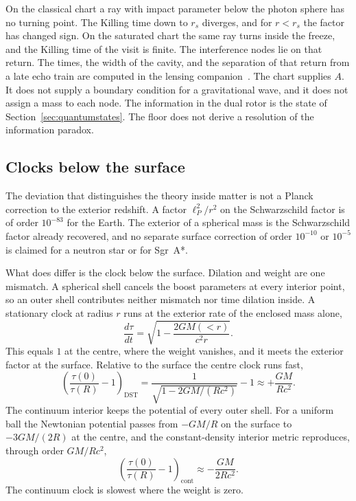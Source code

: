 \documentclass[a4paper]{article}
\begin{document}
On the classical chart a ray with impact parameter below the photon sphere has no turning point. The Killing time down to \(r_s\) diverges, and for \(r<r_s\) the factor has changed sign. On the saturated chart the same ray turns inside the freeze, and the Killing time of the visit is finite. The interference nodes lie on that return. The times, the width of the cavity, and the separation of that return from a late echo train are computed in the lensing companion~\cite{dst-lensing}. The chart supplies \(A\). It does not supply a boundary condition for a gravitational wave, and it does not assign a mass to each node. The information in the dual rotor is the state of Section~\ref{sec:quantumstates}. The floor does not derive a resolution of the information paradox.

\subsection{Clocks below the surface}
\label{subsec:interior-clock}

The deviation that distinguishes the theory inside matter is not a Planck correction to the exterior redshift. A factor \(\ell_P^{2}/r^{2}\) on the Schwarzschild factor is of order \(10^{-83}\) for the Earth. The exterior of a spherical mass is the Schwarzschild factor already recovered, and no separate surface correction of order \(10^{-10}\) or \(10^{-5}\) is claimed for a neutron star or for Sgr~A*.

What does differ is the clock below the surface. Dilation and weight are one mismatch. A spherical shell cancels the boost parameters at every interior point, so an outer shell contributes neither mismatch nor time dilation inside. A stationary clock at radius \(r\) runs at the exterior rate of the enclosed mass alone,
\begin{equation}
\label{eq:interior-clock}
\frac{d\tau}{dt}
=\sqrt{1-\frac{2GM(<r)}{c^{2}r}}.
\end{equation}
This equals \(1\) at the centre, where the weight vanishes, and it meets the exterior factor at the surface. Relative to the surface the centre clock runs fast,
\begin{equation}
\label{eq:dst-centre}
\left(\frac{\tau(0)}{\tau(R)}-1\right)_{\mathrm{DST}}
=\frac{1}{\sqrt{1-2GM/(Rc^{2})}}-1
\approx +\frac{GM}{Rc^{2}}.
\end{equation}
The continuum interior keeps the potential of every outer shell. For a uniform ball the Newtonian potential passes from \(-GM/R\) on the surface to \(-3GM/(2R)\) at the centre, and the constant-density interior metric reproduces, through order \(GM/Rc^{2}\),
\begin{equation}
\label{eq:continuum-centre}
\left(\frac{\tau(0)}{\tau(R)}-1\right)_{\mathrm{cont}}
\approx -\frac{GM}{2Rc^{2}}.
\end{equation}
The continuum clock is slowest where the weight is zero.
\end{document}
